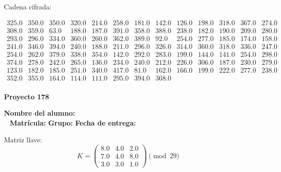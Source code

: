 \documentclass[12pt]{article}
\begin{document}
Cadena cifrada:
\begin{center}
$\begin{array}{lllllllllllll}
325.0 & 350.0 & 350.0 & 320.0 & 214.0 & 258.0 & 181.0 & 142.0 & 126.0 & 198.0 & 318.0 & 367.0 & 274.0\\
308.0 & 359.0 & 63.0 & 188.0 & 187.0 & 391.0 & 358.0 & 388.0 & 238.0 & 182.0 & 190.0 & 209.0 & 280.0\\
293.0 & 296.0 & 334.0 & 360.0 & 260.0 & 362.0 & 389.0 & 92.0 & 254.0 & 277.0 & 185.0 & 174.0 & 158.0\\
241.0 & 346.0 & 394.0 & 240.0 & 188.0 & 211.0 & 296.0 & 326.0 & 314.0 & 360.0 & 318.0 & 336.0 & 247.0\\
254.0 & 262.0 & 379.0 & 338.0 & 354.0 & 142.0 & 292.0 & 283.0 & 199.0 & 144.0 & 141.0 & 254.0 & 298.0\\
374.0 & 278.0 & 242.0 & 265.0 & 136.0 & 234.0 & 240.0 & 212.0 & 226.0 & 306.0 & 187.0 & 230.0 & 279.0\\
123.0 & 182.0 & 185.0 & 251.0 & 340.0 & 417.0 & 81.0 & 162.0 & 166.0 & 199.0 & 222.0 & 277.0 & 238.0\\
352.0 & 355.0 & 164.0 & 114.0 & 111.0 & 295.0 & 394.0 & 368.0\\
\end{array}$
\end{center}

\newpage


\textbf{Proyecto 178}

\textbf{Nombre del alumno:} \underline{\hspace{13cm}}\\\
\vspace{1cm}
\textbf{Matrícula:} \underline{\hspace{4cm}} \hspace{1cm}
\textbf{Grupo:} \underline{\hspace{2cm}}
\textbf{Fecha de entrega:} \underline{\hspace{2cm}}

\medskip

Matriz llave:
\[
K = \begin{pmatrix}
8.0 & 4.0 & 2.0\\
7.0 & 4.0 & 8.0\\
3.0 & 3.0 & 1.0
\end{pmatrix} \pmod{29}
\]
\end{document}

